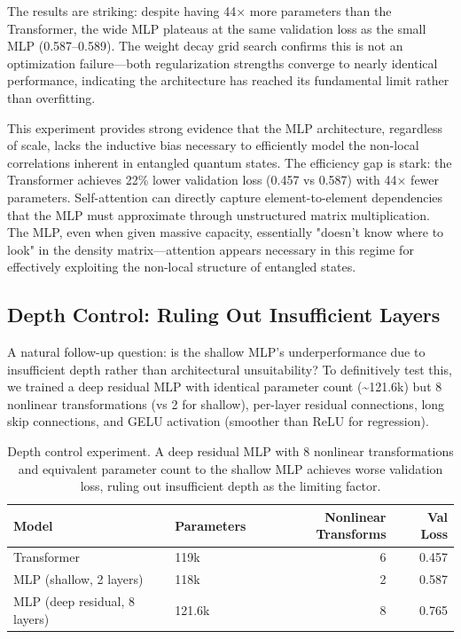 \documentclass[11pt]{article}
\begin{document}
The results are striking: despite having 44× more parameters than the Transformer, the wide MLP plateaus at the same validation loss as the small MLP (0.587–0.589). The weight decay grid search confirms this is not an optimization failure—both regularization strengths converge to nearly identical performance, indicating the architecture has reached its fundamental limit rather than overfitting.

This experiment provides strong evidence that the MLP architecture, regardless of scale, lacks the inductive bias necessary to efficiently model the non-local correlations inherent in entangled quantum states. The efficiency gap is stark: the Transformer achieves 22\% lower validation loss (0.457 vs 0.587) with 44× fewer parameters. Self-attention can directly capture element-to-element dependencies that the MLP must approximate through unstructured matrix multiplication. The MLP, even when given massive capacity, essentially "doesn't know where to look" in the density matrix—attention appears necessary in this regime for effectively exploiting the non-local structure of entangled states.
\subsection{Depth Control: Ruling Out Insufficient Layers}
\label{sec:orgf7e8043}

A natural follow-up question: is the shallow MLP's underperformance due to insufficient depth rather than architectural unsuitability? To definitively test this, we trained a deep residual MLP with identical parameter count (\textasciitilde{}121.6k) but 8 nonlinear transformations (vs 2 for shallow), per-layer residual connections, long skip connections, and GELU activation (smoother than ReLU for regression).

\begin{table}[htbp]
\caption{\label{tab:org8afae8d}Depth control experiment. A deep residual MLP with 8 nonlinear transformations and equivalent parameter count to the shallow MLP achieves worse validation loss, ruling out insufficient depth as the limiting factor.}
\centering
\begin{tabular}{llrr}
Model & Parameters & Nonlinear Transforms & Val Loss\\
\hline
Transformer & 119k & 6 & 0.457\\
MLP (shallow, 2 layers) & 118k & 2 & 0.587\\
MLP (deep residual, 8 layers) & 121.6k & 8 & 0.765\\
\end{tabular}
\end{table}
\end{document}
